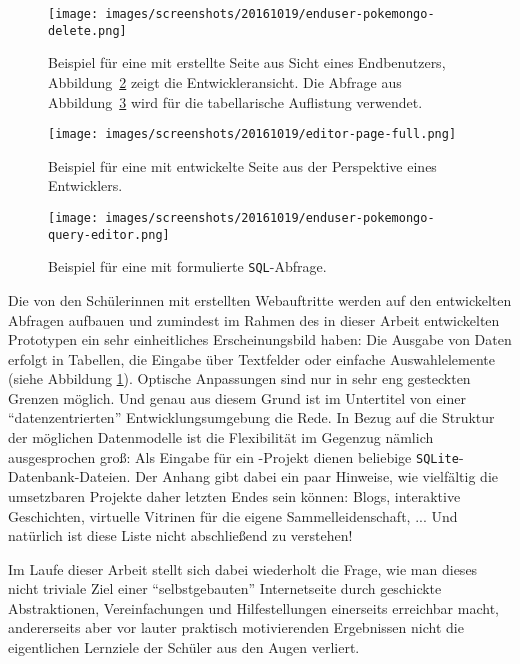 \begin{figure}[t]
  \texttt{[image: images/screenshots/20161019/enduser-pokemongo-delete.png]}
  \caption{Beispiel für eine mit \idename{} erstellte Seite aus Sicht eines Endbenutzers,  Abbildung~\ref{fig:introduction-example-pokemon-go-page-editor} zeigt die Entwickleransicht. Die Abfrage aus Abbildung~\ref{fig:introduction-example-pokemon-go-query-editor} wird für die tabellarische Auflistung verwendet.}
  \label{fig:introduction-example-pokemon-go-catch}
\end{figure}

\begin{figure}[p]
  \texttt{[image: images/screenshots/20161019/editor-page-full.png]}
  \caption{Beispiel für eine mit \idename{} entwickelte Seite aus der Perspektive eines Entwicklers.}
  \label{fig:introduction-example-pokemon-go-page-editor}
\end{figure}

\begin{figure}[p]
  \texttt{[image: images/screenshots/20161019/enduser-pokemongo-query-editor.png]}
  \caption{Beispiel für eine mit \idename{} formulierte \texttt{SQL}-Abfrage.}
  \label{fig:introduction-example-pokemon-go-query-editor}
\end{figure}

Die von den Schülerinnen mit \idename{} erstellten Webauftritte werden auf den entwickelten Abfragen aufbauen und zumindest im Rahmen des in dieser Arbeit entwickelten Prototypen ein sehr einheitliches Erscheinungsbild haben: Die Ausgabe von Daten erfolgt in Tabellen, die Eingabe über Textfelder oder einfache Auswahlelemente (siehe Abbildung \ref{fig:introduction-example-pokemon-go-catch}). Optische Anpassungen sind nur in sehr eng gesteckten Grenzen möglich. Und genau aus diesem Grund ist im Untertitel von einer "`datenzentrierten"' Entwicklungsumgebung die Rede. In Bezug auf die Struktur der möglichen Datenmodelle ist die Flexibilität im Gegenzug nämlich ausgesprochen groß: Als Eingabe für ein \idename{}-Projekt dienen beliebige \texttt{SQLite}-Datenbank-Dateien. Der Anhang gibt dabei ein paar Hinweise, wie vielfältig die umsetzbaren Projekte daher letzten Endes sein können: Blogs, interaktive Geschichten, virtuelle Vitrinen für die eigene Sammelleidenschaft, ... Und natürlich ist diese Liste nicht abschließend zu verstehen!

Im Laufe dieser Arbeit stellt sich dabei wiederholt die Frage, wie man dieses nicht triviale Ziel einer "`selbstgebauten"' Internetseite durch geschickte Abstraktionen, Vereinfachungen und Hilfestellungen einerseits erreichbar macht, andererseits aber vor lauter praktisch motivierenden Ergebnissen nicht die eigentlichen Lernziele der Schüler aus den Augen verliert.

